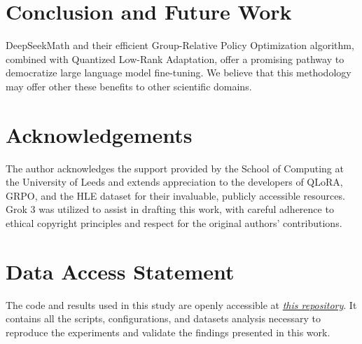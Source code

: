 \documentclass{svproc}
\begin{document}
\begin{center}
  
\end{center}



\section{Conclusion and Future Work}
DeepSeekMath and their efficient Group-Relative Policy Optimization algorithm, combined with Quantized Low-Rank Adaptation, offer a promising pathway to democratize large language model fine-tuning. We believe that this methodology may offer other these benefits to other scientific domains.




\section*{Acknowledgements}

The author acknowledges the support provided by the School of Computing at the University of Leeds and extends appreciation to the developers of QLoRA, GRPO, and the HLE dataset for their invaluable, publicly accessible resources. Grok 3 was utilized to assist in drafting this work, with careful adherence to ethical copyright principles and respect for the original authors’ contributions.




\section*{Data Access Statement}

The code and results used in this study are openly accessible at {\it \href{https://github.com/pre63/quantized-optimization-of-mathematical-reasoning-study}{this repository}}. It contains all the scripts, configurations, and datasets analysis necessary to reproduce the experiments and validate the findings presented in this work.




\printbibliography


\end{document}
